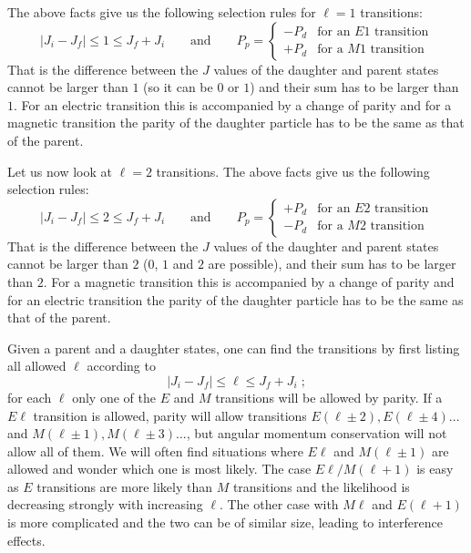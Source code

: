 \documentclass[12pt]{article}
\begin{document}
The above facts give us the following selection rules for $\ell=1$ transitions:
\[|J_i-J_f|\leq 1\leq J_f+J_i \qquad\mbox{and}\qquad P_p=\left\{\begin{array}{cc}
-P_d&\mbox{for an $E1$ transition}\\
+P_d&\mbox{for a $M1$ transition}\end{array}\right.\]
That is the difference between the $J$ values of the daughter and parent states cannot be larger than $1$ (so it can be $0$ or $1$) and their sum has to be larger than $1$. For an electric transition this is accompanied by a change of parity and for a magnetic transition the parity of the daughter particle has to be the same as that of the parent.

Let us now look at $\ell=2$ transitions. The above facts give us the following selection rules:
\[|J_i-J_f|\leq 2\leq J_f+J_i \qquad\mbox{and}\qquad P_p=\left\{\begin{array}{cc}
+P_d&\mbox{for an $E2$ transition}\\
-P_d&\mbox{for a $M2$ transition}\end{array}\right.\]
That is the difference between the $J$ values of the daughter and parent states cannot be larger than $2$ ($0$, $1$ and $2$ are possible), and their sum has to be larger than $2$. For a magnetic transition this is accompanied by a change of parity and for an electric transition the parity of the daughter particle has to be the same as that of the parent. 

Given a parent and a daughter states, one can find the transitions by first listing all allowed $\ell$ according to
\[|J_i-J_f|\leq \ell\leq J_f+J_i\;; \]
for each $\ell$ only one of the $E$ and $M$ transitions will be allowed by parity. If a $E\ell$ transition is allowed, parity will allow transitions $E(\ell\pm2),E(\ell\pm4)...$ and $M(\ell\pm1),M(\ell\pm3)...$, but angular momentum conservation will not allow all of them. We will often find situations where $E\ell$ and $M(\ell\pm1)$ are allowed and wonder which one is most likely. The case $E\ell/M(\ell+1)$ is easy as $E$ transitions are more likely than $M$ transitions and the likelihood is decreasing strongly with increasing $\ell$. The other case with $M\ell$ and $E(\ell+1)$ is more complicated and the two can be of similar size, leading to interference effects.  
\pagebreak
\end{document}
